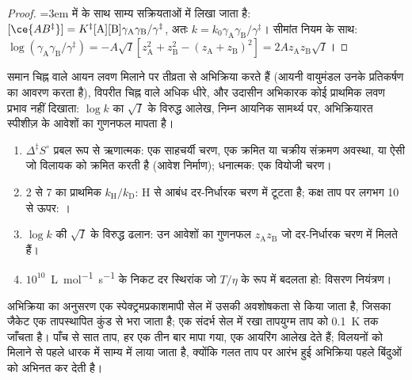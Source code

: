 \begin{proof}
\emergencystretch=3em  में  के साथ साम्य सक्रियताओं में लिखा जाता है:
$[\ce{AB^{\ddagger}}] = K^{\ddagger}[\mathrm A][\mathrm B]\gamma_{\mathrm A}\gamma_{\mathrm B}/\gamma^{\ddagger}$, अतः $k = k_0\gamma_{\mathrm A}\gamma_{\mathrm B}/\gamma^{\ddagger}$।
सीमांत नियम के साथ: $\log(\gamma_{\mathrm A}\gamma_{\mathrm B}/\gamma^{\ddagger}) = -A\sqrt I[z_{\mathrm A}^2 + z_{\mathrm B}^2 - (z_{\mathrm A} + z_{\mathrm B})^2] =
2Az_{\mathrm A}z_{\mathrm B}\sqrt I$।
\end{proof}

समान चिह्न वाले आयन लवण मिलाने पर तीव्रता से अभिक्रिया करते हैं (आयनी वायुमंडल
उनके प्रतिकर्षण का आवरण करता है), विपरीत चिह्न वाले अधिक धीरे, और उदासीन
अभिकारक कोई प्राथमिक लवण प्रभाव नहीं दिखाता: $\log k$ का $\sqrt I$ के विरुद्ध
आलेख, निम्न आयनिक सामर्थ्य पर, अभिक्रियारत स्पीशीज़ के आवेशों का गुणनफल मापता है।

\begin{method}[सक्रियण प्राचल क्रियाविधि के बारे में क्या बताते हैं]\label{met:b3:rate-theories:mechanism-evidence}
\begin{enumerate}
  \item $\Delta^{\ddagger}S^\circ$ प्रबल रूप से ऋणात्मक: एक साहचर्यी चरण, एक क्रमित या चक्रीय
        संक्रमण अवस्था, या ऐसी जो विलायक को क्रमित करती है (आवेश निर्माण);
        धनात्मक: एक वियोजी चरण।
  \item 2 से 7 का प्राथमिक $k_{\mathrm H}/k_{\mathrm D}$: H से आबंध
        दर-निर्धारक चरण में टूटता है; कक्ष ताप पर लगभग 10 से ऊपर: ।
  \item $\log k$ की $\sqrt I$ के विरुद्ध ढलान: उन आवेशों का गुणनफल $z_{\mathrm A}z_{\mathrm B}$ जो
        दर-निर्धारक चरण में मिलते हैं।
  \item $10^{10}$~\unit{L.mol^{-1}.s^{-1}} के निकट दर स्थिरांक जो $T/\eta$ के रूप में बदलता हो:
        विसरण नियंत्रण।
\end{enumerate}
\end{method}

\begin{inthelab}
अभिक्रिया का अनुसरण एक स्पेक्ट्रमप्रकाशमापी सेल में उसकी अवशोषकता से किया जाता है, जिसका
जैकेट एक तापस्थापित कुंड से भरा जाता है; एक संदर्भ सेल में रखा तापयुग्म
ताप को \qty{0.1}{K} तक जाँचता है। पाँच से सात ताप, हर एक
तीन बार मापा गया, एक आयरिंग आलेख देते हैं; विलयनों को मिलाने से पहले धारक में
साम्य में लाया जाता है, क्योंकि गलत ताप पर आरंभ हुई अभिक्रिया
पहले बिंदुओं को अभिनत कर देती है।
\end{inthelab}

